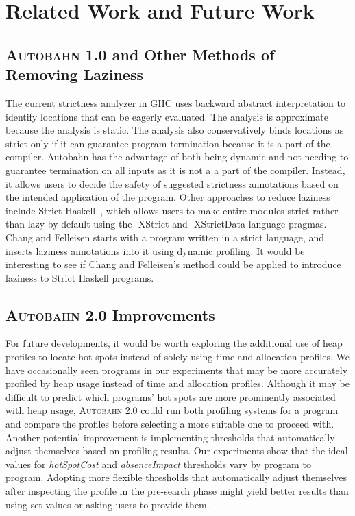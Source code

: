 \documentclass[format=sigplan, review=true]{acmart}
\newcommand{\hotspots}[0]{hot spots}
\newcommand{\hotspotcost}[0]{\textit{hotSpotCost}}
\newcommand{\Ao}[0]{\textsc{Autobahn 1.0}}
\newcommand{\At}[0]{\textsc{Autobahn 2.0}}
\newcommand{\preopt}[0]{pre-search}
\newcommand{\absim}[0]{\textit{absenceImpact}}
\begin{document}
\section{Related Work and Future Work}

\subsection{\Ao{} and Other Methods of Removing Laziness}

The current strictness analyzer in GHC uses backward abstract
interpretation to identify locations that can be eagerly
evaluated. The analysis is approximate because the analysis is
static. The analysis also conservatively binds locations as strict
only if it can guarantee program termination because it is a part of
the compiler. Autobahn has the advantage of both being dynamic and not
needing to guarantee termination on all inputs as it is not a a part
of the compiler. Instead, it allows users to decide the safety of
suggested strictness annotations based on the intended application of
the program. Other approaches to reduce laziness include Strict
Haskell~\cite{strict-haskell}, which allows users to make entire modules strict rather than
lazy by default using the -XStrict and -XStrictData language
pragmas. Chang and Felleisen starts with a program written in a strict
language, and inserts laziness annotations into it using dynamic
profiling. It would be interesting to see if Chang and Felleisen's
method could be applied to introduce laziness to Strict Haskell
programs.

\subsection{\At{} Improvements}
For future developments, it would be worth exploring the additional use of heap profiles to locate hot spots instead of solely using time and allocation profiles. We have occasionally seen programs in our experiments that may be more accurately profiled by heap usage instead of time and allocation profiles. Although it may be difficult to predict which programs' \hotspots{} are more prominently associated with heap usage, \At{} could run both profiling systems for a program and compare the profiles before selecting a more suitable one to proceed with. Another potential improvement is implementing thresholds that automatically adjust themselves based on profiling results. Our experiments show that the ideal values for \hotspotcost{} and \absim{} thresholds vary by program to program. Adopting more flexible thresholds that automatically adjust themselves after inspecting the profile in the \preopt{} phase might yield better results than using set values or asking users to provide them.
\end{document}
